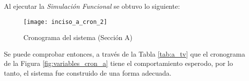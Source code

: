 \documentclass[../procedimientos.tex]{subfiles}
\begin{document}
Al ejecutar la \textit{Simulación Funcional} se obtuvo lo siguiente:
\begin{figure}[H]
  \centering
  \texttt{[image: inciso\_a\_cron\_2]}
  \caption{Cronograma del sistema (Sección A)}
  \label{fig:cron_a}
\end{figure}

Se puede comprobar entonces, a través de la Tabla \ref{tab:a_tv} que el 
cronograma de la Figura \ref{fig:variables_cron_a} tiene el comportamiento 
esperodo, por lo tanto, el sistema fue construido de una forma adecuada.


\newpage
\end{document}
